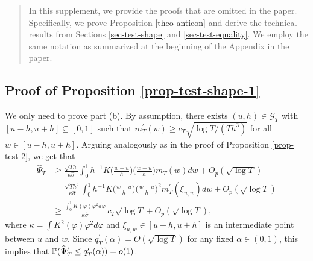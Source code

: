 \documentclass[a4paper,12pt]{article}
\begin{document}

\version{\today}

\vspace{-1.2cm}


\renewcommand{\abstractname}{}
\begin{abstract}
\noindent In this supplement, we provide the proofs that are omitted in the paper. Specifically, we prove Proposition \ref{theo-anticon} and derive the technical results from Sections \ref{sec-test-shape} and \ref{sec-test-equality}. We employ the same notation as summarized at the beginning of the Appendix in the paper. 
\end{abstract}


\renewcommand{\baselinestretch}{1.2}\normalsize
\def\theequation{S.\arabic{equation}}
\setcounter{equation}{0}
\allowdisplaybreaks[1]



\subsection*{Proof of Proposition \ref{prop-test-shape-1}}


We only need to prove part (b). By assumption, there exists $(u,h) \in \mathcal{G}_T$ with $[u-h,u+h] \subseteq [0,1]$ such that $m_T^\prime(w) \ge c_T \sqrt{\log T/(Th^3)}$ for all $w \in [u-h,u+h]$. Arguing analogously as in the proof of Proposition \ref{prop-test-2}, we get that 
\begin{align*}
\widehat{\Psi}_T 
 & \ge \frac{\sqrt{Th}}{\kappa \widehat{\sigma}} \int_0^1 h^{-1} K\Big(\frac{w-u}{h}\Big) \Big(\frac{w-u}{h}\Big) m_T(w) dw + O_p(\sqrt{\log T}) \\
 & = \frac{\sqrt{Th^3}}{\kappa \widehat{\sigma}} \int_0^1 h^{-1} K\Big(\frac{w-u}{h}\Big) \Big(\frac{w-u}{h}\Big)^2 m_T^\prime(\xi_{u,w}) dw + O_p(\sqrt{\log T}) \\[0.1cm]
 & \ge \frac{\int_0^1 K(\varphi) \varphi^2 d\varphi}{\kappa \widehat{\sigma}} \, c_T \sqrt{\log T} + O_p(\sqrt{\log T}),
\end{align*}  
where $\kappa = \int K^2(\varphi) \varphi^2 d\varphi$ and $\xi_{u,w} \in [u-h,u+h]$ is an intermediate point between $u$ and $w$. Since $q_T^\prime(\alpha) = O(\sqrt{\log T})$ for any fixed $\alpha \in (0,1)$, this implies that $\mathbb{P}(\widehat{\Psi}_T^\prime \le q_T^\prime(\alpha)) = o(1)$. 
\end{document}
